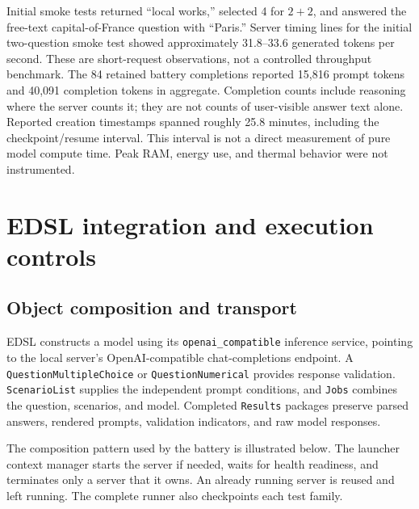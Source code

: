 \documentclass[11pt,letterpaper]{article}
\begin{document}
Initial smoke tests returned ``local works,'' selected 4 for $2+2$, and answered
the free-text capital-of-France question with ``Paris.'' Server timing lines
for the initial two-question smoke test showed approximately 31.8--33.6
generated tokens per second. These are short-request observations, not a
controlled throughput benchmark. The 84 retained battery completions reported
15,816 prompt tokens and 40,091 completion tokens in aggregate. Completion
counts include reasoning where the server counts it; they are not counts of
user-visible answer text alone. Reported creation timestamps spanned roughly
25.8 minutes, including the checkpoint/resume interval. This interval is not
a direct measurement of pure model compute time. Peak RAM, energy use, and
thermal behavior were not instrumented.

\section{EDSL integration and execution controls}
\subsection{Object composition and transport}
EDSL constructs a model using its \texttt{openai\_compatible} inference
service, pointing to the local server's OpenAI-compatible chat-completions
endpoint. A \texttt{QuestionMultipleChoice} or \texttt{QuestionNumerical}
provides response validation. \texttt{ScenarioList} supplies the independent
prompt conditions, and \texttt{Jobs} combines the question, scenarios, and
model. Completed \texttt{Results} packages preserve parsed answers, rendered
prompts, validation indicators, and raw model responses.

The composition pattern used by the battery is illustrated below. The launcher
context manager starts the server if needed, waits for health readiness, and
terminates only a server that it owns. An already running server is reused
and left running. The complete runner also checkpoints each test family.
\end{document}
